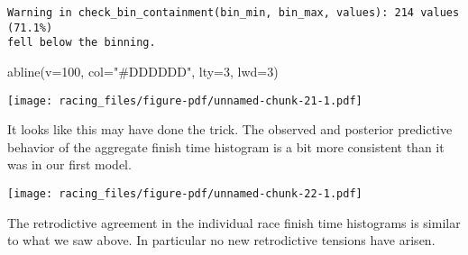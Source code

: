 \documentclass[
  letterpaper,
  DIV=11,
  numbers=noendperiod]{scrartcl}
\newenvironment{Shaded}{\begin{snugshade}}{\end{snugshade}}
\newcommand{\AttributeTok}[1]{\textcolor[rgb]{0.40,0.45,0.13}{#1}}
\newcommand{\DecValTok}[1]{\textcolor[rgb]{0.68,0.00,0.00}{#1}}
\newcommand{\FunctionTok}[1]{\textcolor[rgb]{0.28,0.35,0.67}{#1}}
\newcommand{\NormalTok}[1]{\textcolor[rgb]{0.00,0.23,0.31}{#1}}
\newcommand{\SpecialCharTok}[1]{\textcolor[rgb]{0.37,0.37,0.37}{#1}}
\newcommand{\StringTok}[1]{\textcolor[rgb]{0.13,0.47,0.30}{#1}}
\begin{document}
\begin{verbatim}
Warning in check_bin_containment(bin_min, bin_max, values): 214 values (71.1%)
fell below the binning.
\end{verbatim}

\begin{Shaded}
\begin{Highlighting}[]
\FunctionTok{abline}\NormalTok{(}\AttributeTok{v=}\DecValTok{100}\NormalTok{, }\AttributeTok{col=}\StringTok{"\#DDDDDD"}\NormalTok{, }\AttributeTok{lty=}\DecValTok{3}\NormalTok{, }\AttributeTok{lwd=}\DecValTok{3}\NormalTok{)}
\end{Highlighting}
\end{Shaded}

\texttt{[image: racing\_files/figure-pdf/unnamed-chunk-21-1.pdf]}

It looks like this may have done the trick. The observed and posterior
predictive behavior of the aggregate finish time histogram is a bit more
consistent than it was in our first model.

\begin{Shaded}
\end{Shaded}

\texttt{[image: racing\_files/figure-pdf/unnamed-chunk-22-1.pdf]}

The retrodictive agreement in the individual race finish time histograms
is similar to what we saw above. In particular no new retrodictive
tensions have arisen.
\end{document}
